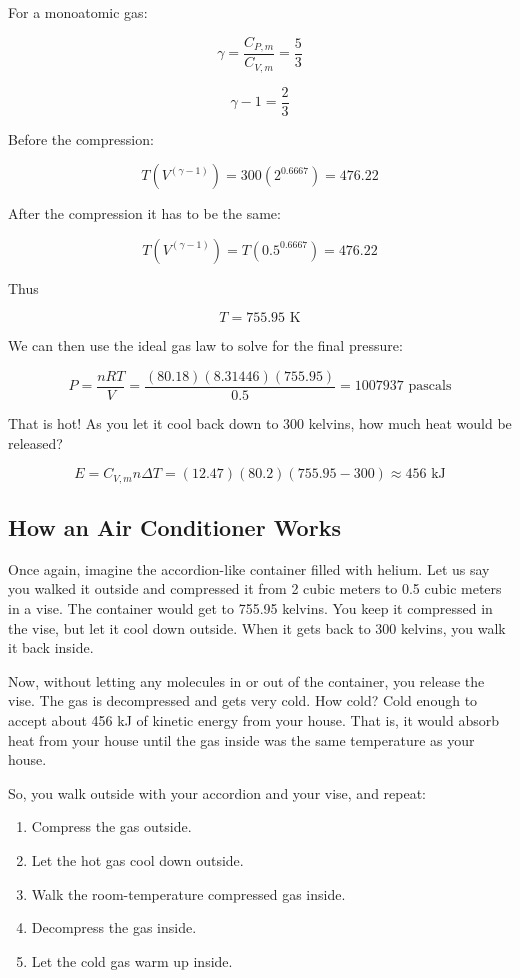 For a monoatomic gas:

$$\gamma = \frac{C_{P,m}}{C_{V,m}} = \frac{5}{3}$$

$$\gamma - 1 = \frac{2}{3}$$

Before the compression: 

$$T \left(V^{\left( \gamma - 1 \right)} \right) = 300 \left( 2^{0.6667} \right) = 476.22$$

After the compression it has to be the same:

$$T \left(V^{\left( \gamma - 1 \right)} \right) = T \left( 0.5^{0.6667} \right) = 476.22$$

Thus 

$$T = 755.95\text{ K}$$

We can then use the ideal gas law to solve for the final pressure:

$$P = \frac{n R T}{V} = \frac{(80.18)(8.31446)(755.95)}{0.5} = 1007937 \text{ pascals}$$

That is hot! As you let it cool back down to 300 kelvins, how much heat would be released? 

$$E = C_{V,m} n \Delta T = (12.47)(80.2)(755.95 - 300) \approx 456 \text{ kJ}$$

\subsection{How an Air Conditioner Works}

Once again, imagine the accordion-like container filled with helium. Let us say you walked it outside and compressed it from 2 cubic meters to 0.5 cubic meters in a vise. The container would get to 755.95 kelvins. You keep it compressed in the vise, but let it cool down outside. When it gets back to 300 kelvins, you walk it back inside.

Now, without letting any molecules in or out of the container, you release the vise. The gas is decompressed and gets very cold. How cold? Cold enough to accept about 456 kJ of kinetic energy from your house. That is, it would absorb heat from your house until the gas inside was the same temperature as your house.

So, you walk outside with your accordion and your vise, and repeat:
\begin{enumerate}
\item Compress the gas outside.
\item Let the hot gas cool down outside.
\item Walk the room-temperature compressed gas inside.
\item Decompress the gas inside.
\item Let the cold gas warm up inside.
\end{enumerate}

